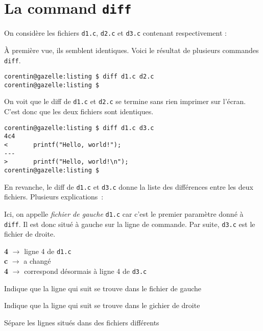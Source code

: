 \documentclass[10pt]{article}
\begin{document}
\newpage

\section{La command \texttt{diff}}

On considère les fichiers \texttt{d1.c}, \texttt{d2.c} et \texttt{d3.c}
 contenant respectivement :

  
  
  

\vspace{0.5cm}

À première vue, ils semblent identiques. Voici le résultat de
plusieurs commandes \texttt{diff}.

\begin{Verbatim}[xleftmargin=2em]
corentin@gazelle:listing $ diff d1.c d2.c
corentin@gazelle:listing $
\end{Verbatim}

On voit que le diff de \texttt{d1.c} et \texttt{d2.c} se termine
sans rien imprimer sur l'écran. C'est donc que les deux fichiers sont
identiques.

\begin{Verbatim}[xleftmargin=2em]
corentin@gazelle:listing $ diff d1.c d3.c
4c4
<       printf("Hello, world!");
---
>       printf("Hello, world!\n");
corentin@gazelle:listing $
\end{Verbatim}

En revanche, le diff de \texttt{d1.c} et \texttt{d3.c} donne la
liste des différences entre les deux fichiers. Plusieurs
explications~:

\begin{description}[leftmargin=!,labelwidth=\widthof{\bfseries gauche/droite}]
\item[gauche/droite] Ici, on appelle \textit{fichier de gauche}
\texttt{d1.c} car c'est le premier paramètre donné à \texttt{diff}. Il
est donc situé à gauche sur la ligne de commande. Par suite,
\texttt{d3.c} est le fichier de droite.
\item[4c4] \textbf{4} $\rightarrow$ ligne 4 de \texttt{d1.c} \\
  \textbf{c} $\rightarrow$ a changé \\
  \textbf{4} $\rightarrow$ correspond désormais à ligne 4 de \texttt{d3.c}
\item[\texttt{<}] Indique que la ligne qui suit se trouve dans le fichier de
  gauche
\item[\texttt{>}] Indique que la ligne qui suit se trouve dans le gichier de
  droite
\item[\texttt{------}] Sépare les lignes situés dans des fichiers différents
\end{description}
\end{document}
